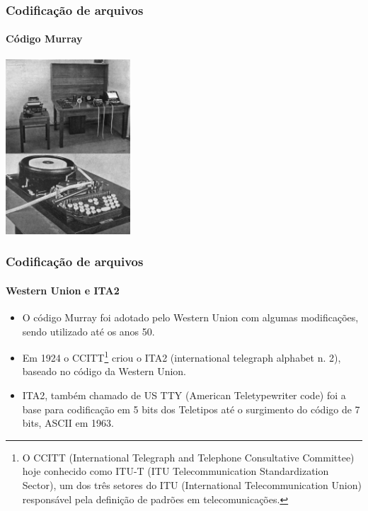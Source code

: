 \begin{frame}
\frametitle{Codificação de arquivos}
\framesubtitle{Código Murray}
        \centering
        \includegraphics[width=0.35\textwidth,height=0.8\textheight,keepaspectratio]{figures/murrayapparatus.jpg} 
\end{frame}


\begin{frame}
\frametitle{Codificação de arquivos}
\framesubtitle{Western Union e ITA2}
   \begin{itemize}
   \item O código Murray foi adotado pelo Western Union com algumas modificações, sendo utilizado até os anos 50.
   \item Em 1924 o CCITT\footnote{O CCITT (International Telegraph and Telephone Consultative Committee) hoje conhecido
                                 como ITU-T (ITU Telecommunication Standardization Sector), um dos três setores do
                                 ITU (International Telecommunication Union) responsável pela definição de padrões em telecomunicações.}
         criou o ITA2 (international telegraph alphabet n. 2), baseado no código da Western Union.
   \item ITA2, também chamado de US TTY (American Teletypewriter code) foi a base para codificação em 5 bits dos Teletipos
         até o surgimento do código de 7 bits, ASCII em 1963.
   \end{itemize}
\end{frame}


